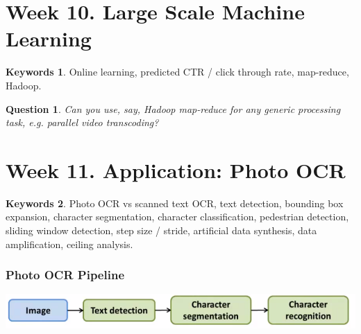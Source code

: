 \documentclass[12pt]{article}
\theoremstyle{plain}
\newtheorem{question}[theorem]{Question}
\theoremstyle{definition}
\newtheorem*{keywords}{Keywords}
\theoremstyle{remark}
\begin{document}
\part{Week 10. Large Scale Machine Learning}

\begin{keywords}
Online learning, predicted CTR / click through rate, map-reduce, Hadoop.
\end{keywords}

\begin{question}
Can you use, say, Hadoop map-reduce for any generic processing task, e.g. parallel video transcoding?
\end{question}

\part{Week 11. Application: Photo OCR}

\begin{keywords}
Photo OCR vs scanned text OCR, text detection, bounding box expansion, character segmentation, character classification, pedestrian detection, sliding window detection, step size / stride, artificial data synthesis, data amplification, ceiling analysis.
\end{keywords}

\section{Photo OCR Pipeline}

\centerline{\includegraphics[width=1.0\textwidth]{ocrpipeline}}
\end{document}
